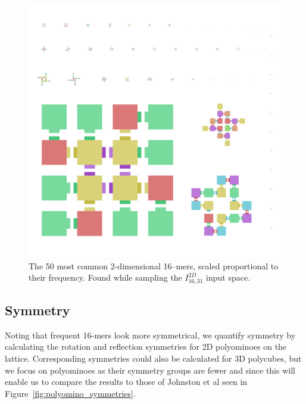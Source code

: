 \begin{figure}[h]
    \centering
    \includegraphics[width=\textwidth]{figures/16-mers_2d.png}
    \caption{The 50 most common 2-dimensional 16--mers, scaled proportional to their frequency. Found while sampling the \(I_{16,31}^{2D}\) input space.}
    \label{fig:16-mer_2d_zoo}
\end{figure}

\subsection{Symmetry}

Noting that frequent 16-mers look more symmetrical, we quantify symmetry by calculating the rotation and reflection symmetries for 2D polyominoes on the lattice. Corresponding symmetries could also be calculated for 3D polycubes, but we focus on polyominoes as their symmetry groups are fewer and since this will enable us to compare the results to those of Johnston et al \cite{johnston2021} seen in Figure~\ref{fig:polyomino_symmetries}.

